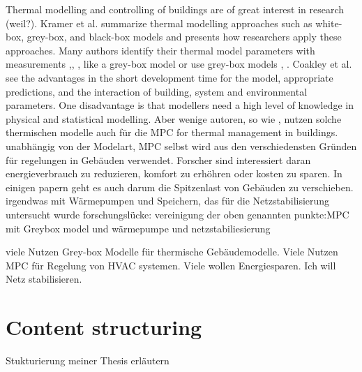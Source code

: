 Thermal modelling and controlling of buildings are of great interest in research (weil?). Kramer et al. 
\cite{Kramer.2012}
summarize thermal modelling approaches such as white-box, grey-box, and black-box models and presents how researchers apply these approaches. Many authors identify their thermal model parameters with measurements \cite{Siroky.2011},\cite{Hazyuk.2012}, \cite{Park.2011}, like a grey-box model or use grey-box models \cite{Freund.2020}, \cite{EvelynSperber.2019}. Coakley et al. \cite{Coakley.2014} see the advantages in the short development time for the model, appropriate predictions, and the interaction of building, system and environmental parameters. One disadvantage is that  modellers need a high level of knowledge in physical and statistical modelling.
Aber wenige autoren, so wie \cite{JiriCigler.}, \cite{Hazyuk.2012b}  nutzen solche thermischen modelle auch für die MPC for thermal management in buildings.
\newline
unabhängig von der Modelart, MPC selbst wird aus den verschiedensten Gründen für regelungen in Gebäuden verwendet. Forscher sind interessiert daran energieverbrauch zu reduzieren, komfort zu erhöhren oder kosten zu sparen. In einigen papern geht es auch darum die Spitzenlast von Gebäuden zu verschieben. 
\newline
irgendwas mit Wärmepumpen und Speichern, das für die Netzstabilisierung untersucht wurde
\newline
forschungslücke: vereinigung der oben genannten punkte:MPC mit Greybox model und wärmepumpe und netzstabiliesierung 




viele Nutzen Grey-box Modelle für thermische Gebäudemodelle. Viele Nutzen MPC für Regelung von HVAC systemen. Viele wollen Energiesparen. Ich will Netz stabilisieren.

\section{Content structuring}
\label{section:contentstructuring}
Stukturierung meiner Thesis erläutern